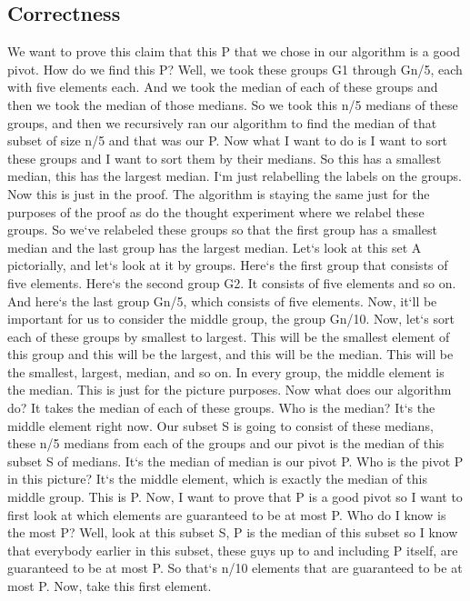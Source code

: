 \subsection{Correctness}
We want to prove this claim that this P that we chose in our algorithm is a good pivot.
How do we find this P? Well, we took these groups G1 through Gn/5, each with five elements each.
And we took the median of each of these groups and then we took the median of those medians.
So we took this n/5 medians of these groups, and then we recursively ran our algorithm to find the median of that subset of size n/5 and that was our P\@.
Now what I want to do is I want to sort these groups and I want to sort them by their medians.
So this has a smallest median, this has the largest median.
I`m just relabelling the labels on the groups.
Now this is just in the proof.
The algorithm is staying the same just for the purposes of the proof as do the thought experiment where we relabel these groups.
So we`ve relabeled these groups so that the first group has a smallest median and the last group has the largest median.
Let`s look at this set A pictorially, and let`s look at it by groups.
Here`s the first group that consists of five elements.
Here`s the second group G2.
It consists of five elements and so on.
And here`s the last group Gn/5, which consists of five elements.
Now, it`ll be important for us to consider the middle group, the group Gn/10.
Now, let`s sort each of these groups by smallest to largest.
This will be the smallest element of this group and this will be the largest, and this will be the median.
This will be the smallest, largest, median, and so on.
In every group, the middle element is the median.
This is just for the picture purposes.
Now what does our algorithm do? It takes the median of each of these groups.
Who is the median? It`s the middle element right now.
Our subset S is going to consist of these medians, these n/5 medians from each of the groups and our pivot is the median of this subset S of medians.
It`s the median of median is our pivot P\@.
Who is the pivot P in this picture? It`s the middle element, which is exactly the median of this middle group.
This is P\@.
Now, I want to prove that P is a good pivot so I want to first look at which elements are guaranteed to be at most P\@.
Who do I know is the most P? Well, look at this subset S, P is the median of this subset so I know that everybody earlier in this subset, these guys up to and including P itself, are guaranteed to be at most P\@.
So that`s n/10 elements that are guaranteed to be at most P\@.
Now, take this first element.
